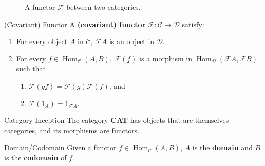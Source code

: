 \documentclass[10pt]{report}
\DeclareMathOperator{\hh}{Hom}
\begin{document}
\begin{figure}[H]
	\centering
\caption{A functor $\mathcal{F}$ between two categories.}
\end{figure}

\begin{defn}{(Covariant) Functor}{}
	A \textbf{(covariant) functor} $\mathcal{F}:\mathscr{C}\to \mathscr{D}$ satisfy:
\begin{enumerate}
	\item For every object $A$ in $\mathscr{C}$, $\mathcal{F}A$ is an object in $\mathscr{D}$.
	\item For every $f \in \hh_{\mathscr{C}}(A,B)$, $\mathcal{F}(f)$ is a morphism in $\hh_{\mathscr{D}}(\mathcal{F}A, \mathcal{F}B)$ such that
		\begin{enumerate}
			\item $\mathcal{F}(gf) = \mathcal{F}(g) \mathcal{F}(f)$, and
			\item $\mathcal{F}(1_{A}) = 1_{\mathcal{F}A}$.
		\end{enumerate}
\end{enumerate}
\end{defn}

\begin{ex}{Category Inception}{}
The category \textbf{CAT} has objects that are themselves categories, and its morphisms are functors.
\end{ex}

\begin{defn}{Domain/Codomain}{}
	Given a functor $f \in \hh_{\mathscr{C}}(A,B)$, $A$ is the \textbf{domain} and $B$ is the \textbf{codomain} of $f$.
\end{defn}
\end{document}
